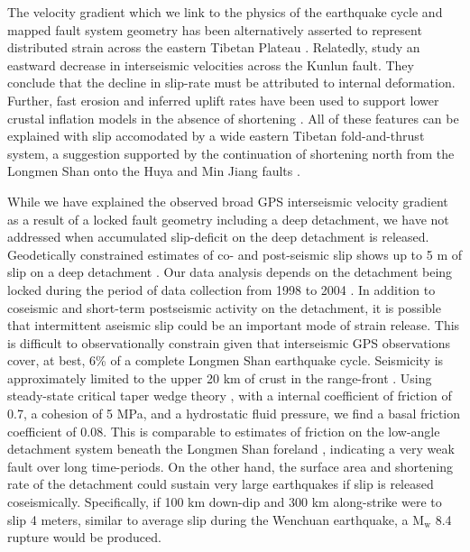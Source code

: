 \documentclass[draft,jgrga]{agutex}
\begin{document}
\begin{article}
The velocity gradient which we link to the physics of the earthquake cycle and mapped fault system geometry has been alternatively asserted to represent distributed strain across the eastern Tibetan Plateau \citep{Royden2008}. Relatedly, \citet{kirby07} study an eastward decrease in interseismic velocities across the Kunlun fault. They conclude that the decline in slip-rate must be attributed to internal deformation. Further, fast erosion and inferred uplift rates have been used to support lower crustal inflation models in the absence of shortening \citep{Kirby2003}. All of these features can be explained with slip accomodated by a wide eastern Tibetan fold-and-thrust system, a suggestion supported by the continuation of shortening north from the Longmen Shan onto the Huya \citep{kirby00} and Min Jiang faults \citep{Chen1994}. 

While we have explained the observed broad GPS interseismic velocity gradient as a result of a locked fault geometry including a deep detachment, we have not addressed when accumulated slip-deficit on the deep detachment is released. Geodetically constrained estimates of co- and post-seismic slip shows up to 5 m of slip on a deep detachment \citep{Qi2011}. Our data analysis depends on the detachment being locked during the period of data collection from 1998 to 2004 \citep{gan07}. In addition to coseismic and short-term postseismic activity on the detachment, it is possible that intermittent aseismic slip could be an important mode of strain release. This is difficult to observationally constrain given that interseismic GPS observations cover, at best, 6\% of a complete Longmen Shan earthquake cycle. Seismicity is approximately limited to the upper 20 km of crust in the range-front \citep{Li2010a}. Using steady-state critical taper wedge theory \citep{dahlen90}, with a internal coefficient of friction of 0.7, a cohesion of 5 MPa, and a hydrostatic fluid pressure, we find a basal friction coefficient of 0.08. This is comparable to estimates of friction on the low-angle detachment system beneath the Longmen Shan foreland \citep{Hubbard2010}, indicating a very weak fault over long time-periods. On the other hand, the surface area and shortening rate of the detachment could sustain very large earthquakes if slip is released coseismically. Specifically, if 100 km down-dip and 300 km along-strike were to slip 4 meters, similar to average slip during the Wenchuan earthquake, a $\textrm{M}_{\textrm{w}}$ 8.4 rupture would be produced.



\end{article}
\end{document}
